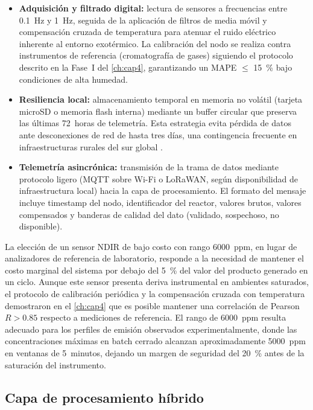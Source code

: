 \begin{itemize}
    \item \textbf{Adquisición y filtrado digital:} lectura de sensores a frecuencias entre \num{0.1}~Hz y \num{1}~Hz, seguida de la aplicación de filtros de media móvil y compensación cruzada de temperatura para atenuar el ruido eléctrico inherente al entorno exotérmico. La calibración del nodo se realiza contra instrumentos de referencia (cromatografía de gases) siguiendo el protocolo descrito en la Fase~I del \cref{ch:cap4}, garantizando un MAPE $\leq$ \num{15}~\% bajo condiciones de alta humedad.
    
    \item \textbf{Resiliencia local:} almacenamiento temporal en memoria no volátil (tarjeta microSD o memoria flash interna) mediante un buffer circular que preserva las últimas \num{72}~horas de telemetría. Esta estrategia evita pérdida de datos ante desconexiones de red de hasta tres días, una contingencia frecuente en infraestructuras rurales del sur global \parencite{herrinCollateralDataQuality2021}.
    
    \item \textbf{Telemetría asincrónica:} transmisión de la trama de datos mediante protocolo ligero (MQTT sobre Wi-Fi o LoRaWAN, según disponibilidad de infraestructura local) hacia la capa de procesamiento. El formato del mensaje incluye timestamp del nodo, identificador del reactor, valores brutos, valores compensados y banderas de calidad del dato (validado, sospechoso, no disponible).
\end{itemize}

La elección de un sensor NDIR de bajo costo con rango \num{6000}~ppm, en lugar de analizadores de referencia de laboratorio, responde a la necesidad de mantener el costo marginal del sistema por debajo del \num{5}~\% del valor del producto generado en un ciclo. Aunque este sensor presenta deriva instrumental en ambientes saturados, el protocolo de calibración periódica y la compensación cruzada con temperatura demostraron en el \cref{ch:cap4} que es posible mantener una correlación de Pearson $R > \num{0.85}$ respecto a mediciones de referencia. El rango de \num{6000}~ppm resulta adecuado para los perfiles de emisión observados experimentalmente, donde las concentraciones máximas en batch cerrado alcanzan aproximadamente \num{5000}~ppm en ventanas de \num{5}~minutos, dejando un margen de seguridad del \num{20}~\% antes de la saturación del instrumento.

\subsection{Capa de procesamiento híbrido}
\label{subsec:cap5_procesamiento}


